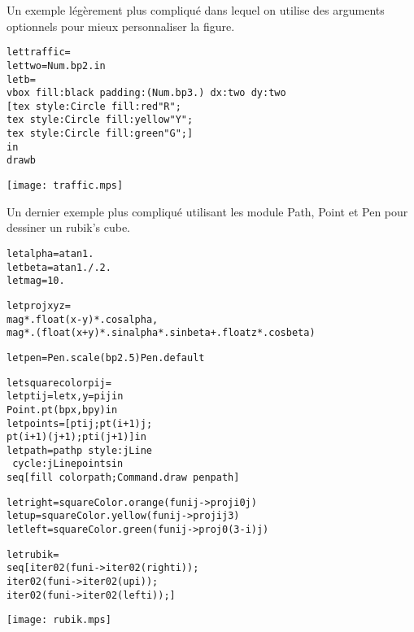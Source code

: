 \documentclass[a4paper,12pt]{article}
\begin{document}
Un exemple légèrement plus compliqué dans lequel on utilise des arguments optionnels pour mieux personnaliser la figure.
~\\

\begin{minipage}{0.7\linewidth}
  \begin{alltt}
    let traffic =
    let two = Num.bp 2. in
    let b = 
    vbox ~fill:black ~padding:(Num.bp 3.) ~dx:two ~dy:two
    [ tex ~style:Circle ~fill:red "R";
      tex ~style:Circle ~fill:yellow "Y";
      tex ~style:Circle ~fill:green "G"; ]
    in
    draw b
  \end{alltt}
\end{minipage}
\begin{minipage}{0.3\linewidth}
  \begin{center}
    \texttt{[image: traffic.mps]}
  \end{center}
\end{minipage}

Un dernier exemple plus compliqué utilisant les module Path, Point et Pen pour dessiner un rubik's cube.
~\\

\begin{minipage}{0.7\linewidth}
  \begin{alltt}
    let alpha = atan 1.
    let beta = atan 1. /. 2. 
    let mag = 10.
    
    let proj x y z = 
    mag *. float (x - y) *. cos alpha, 
    mag *. (float (x + y) *. sin alpha *. sin beta +. float z *. cos beta)
    
    let pen = Pen.scale (bp 2.5) Pen.default
  
    let square color p i j =
    let pt i j = let x,y = p i j in 
    Point.pt (bp x, bp y) in
    let points = [pt i j; pt (i+1) j; 
      pt (i+1) (j+1); pt i (j+1)] in
    let path = pathp ~style:jLine 
    ~cycle:jLine points in
    seq [fill ~color path; Command.draw ~pen path]
    
    let right = square Color.orange (fun i j -> proj i 0 j)
    let up = square Color.yellow (fun i j -> proj i j 3)
    let left = square Color.green (fun i j -> proj 0 (3 - i) j)
    
    let rubik = 
    seq [iter 0 2 (fun i -> iter 0 2 (right i));
      iter 0 2 (fun i -> iter 0 2 (up i));
      iter 0 2 (fun i -> iter 0 2 (left i));]
  \end{alltt}
\end{minipage}
\begin{minipage}{0.3\linewidth}
  \begin{center}
    \texttt{[image: rubik.mps]}
  \end{center}
\end{minipage}
\end{document}
